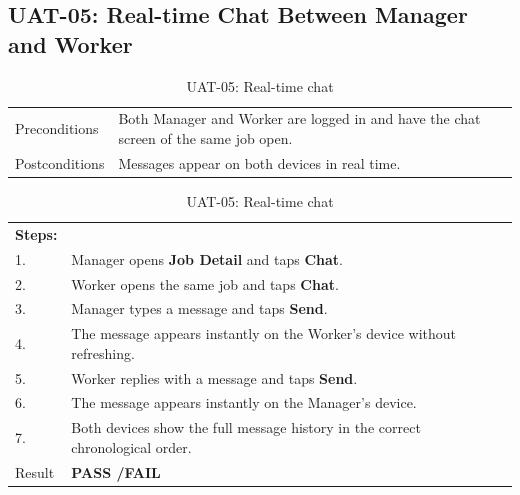 \subsection*{UAT-05: Real-time Chat Between Manager and Worker}
\begin{table}[H]
  \centering
  \begin{tabularx}{\textwidth}{lX}
    \toprule
    Preconditions  & Both Manager and Worker are logged in and have the chat screen of the same job open. \\
    Postconditions & Messages appear on both devices in real time. \\
    \midrule
  \end{tabularx}
  \begin{tabularx}{\textwidth}{lX}
    \textbf{Steps:} & \\
    1. & Manager opens \textbf{Job Detail} and taps \textbf{Chat}. \\
    2. & Worker opens the same job and taps \textbf{Chat}. \\
    3. & Manager types a message and taps \textbf{Send}. \\
    4. & The message appears instantly on the Worker's device without refreshing. \\
    5. & Worker replies with a message and taps \textbf{Send}. \\
    6. & The message appears instantly on the Manager's device. \\
    7. & Both devices show the full message history in the correct chronological order. \\
    \midrule
    Result & \textbf{PASS \quad/\quad FAIL} \\
    \bottomrule
  \end{tabularx}
  \caption{UAT-05: Real-time chat}
\end{table}

